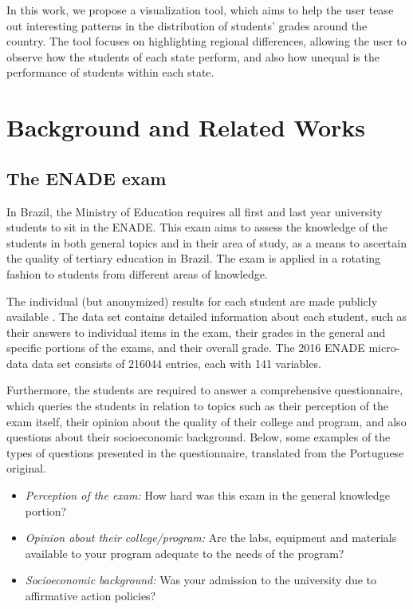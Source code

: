 \documentclass{vgtc}                          %
\begin{document}
In this work, we propose a visualization tool, which aims to help the user tease out interesting patterns in the distribution of students' grades around the country. The tool focuses on highlighting regional differences, allowing the user to observe how the students of each state perform, and also how unequal is the performance of students within each state. 



\section{Background and Related Works}

\subsection{The ENADE exam}

In Brazil, the Ministry of Education requires all first and last year university students to sit in the ENADE. This exam aims to assess the knowledge of the students in both general topics and in their area of study, as a means to ascertain the quality of tertiary education in Brazil. The exam is applied in a rotating fashion to students from different areas of knowledge.

The individual (but anonymized) results for each student are made publicly available \cite{enadedados}. The data set contains detailed information about each student, such as their answers to individual items in the exam, their grades in the general and specific portions of the exams, and their overall grade. The 2016 ENADE micro-data data set consists of 216044 entries, each with 141 variables.

Furthermore, the students are required to answer a comprehensive questionnaire, which queries the students in relation to topics such as their perception of the exam itself, their opinion about the quality of their college and program, and also questions about their socioeconomic background. Below, some examples of the types of questions presented in the questionnaire, translated from the Portuguese original.

\begin{itemize}
	\item{\emph{Perception of the exam:} How hard was this exam in the general knowledge portion?}
	\item{\emph{Opinion about their college/program:} Are the labs, equipment and materials available to your program adequate to the needs of the program? }
	\item{\emph{Socioeconomic background:} Was your admission to the university due to affirmative action policies?}
\end{itemize}
\end{document}
